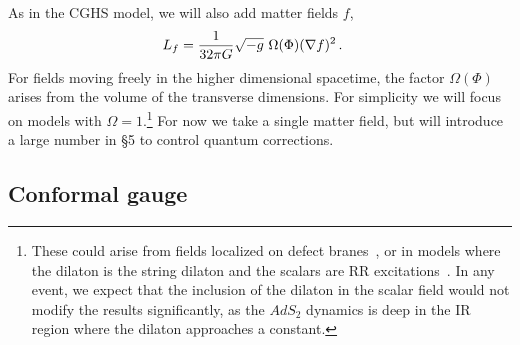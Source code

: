\documentclass[12pt]{article}
\begin{document}
As in the CGHS model, we will also add matter fields $f$,
\begin{align}
L_f &= {1 \over 32\pi G} \sqrt{-g} \ {\Omega(\Phi) } (\nabla f)^2 \,. \label{Om}
\end{align}
For fields moving freely in the higher dimensional spacetime, the factor $\Omega(\Phi)$ arises from the volume of the transverse dimensions.  For simplicity we will focus on models with $\Omega  = 1$.\footnote{These could arise from fields localized on defect branes~\cite{Kachru:2009xf,Jensen:2011su}, or in models where the dilaton is the string dilaton and the scalars are RR excitations~\cite{Callan:1992rs}. In any event, we expect that the inclusion of the dilaton in the scalar field would not modify the results significantly, as the $AdS_2$ dynamics is deep in the IR region where the dilaton approaches a constant.}
For now we take a single matter field, but will introduce a large number in \S5 to control quantum corrections.

 
\subsection{Conformal gauge}
\end{document}
